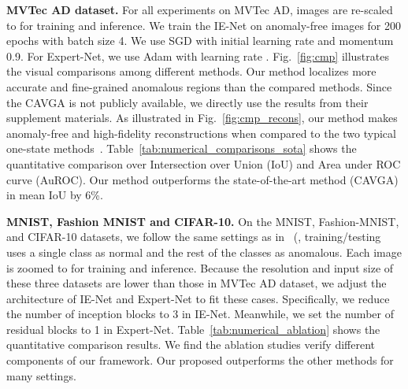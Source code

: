 \documentclass[final]{cvpr}
\begin{document}
\textbf{MVTec AD dataset.} 
For all experiments on MVTec AD, images are re-scaled to  for training and inference. We train the IE-Net on anomaly-free images for 200 epochs with batch size 4. We use SGD with initial learning rate  and momentum 0.9. For Expert-Net, we use Adam with learning rate .
Fig.~\ref{fig:cmp} illustrates the visual comparisons among different methods. Our method localizes more accurate and fine-grained anomalous regions than the compared methods. Since the CAVGA is not publicly available, we directly use the results from their supplement materials. As illustrated in Fig.~\ref{fig:cmp_recons}, our method makes anomaly-free and high-fidelity reconstructions when compared to the two typical one-state methods~\cite{A:bergmann2018improving,A:akccay2019skip}.
Table~\ref{tab:numerical_comparisons_sota} shows the quantitative comparison over Intersection over Union (IoU) and Area under ROC curve (AuROC). Our method outperforms the state-of-the-art method (CAVGA) in mean IoU by 6\%. 
 
\textbf{MNIST, Fashion MNIST and CIFAR-10.}
On the MNIST, Fashion-MNIST, and CIFAR-10 datasets, we follow the same settings as in~\cite{A:deecke2018image} (\ie, training/testing uses a single class as normal and the rest of the classes as anomalous. Each image is zoomed to  for training and inference. Because the resolution and input size of these three datasets are lower than those in MVTec AD dataset, we adjust the architecture of IE-Net and Expert-Net to fit these cases. Specifically, we reduce the number of inception blocks to 3 in IE-Net. Meanwhile, we set the number of residual blocks to 1 in Expert-Net.
Table~\ref{tab:numerical_ablation} shows the quantitative comparison results. We find the ablation studies verify different components of our framework. Our proposed outperforms the other methods for many settings.
\end{document}
